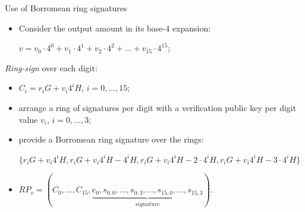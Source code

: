 \documentclass[usenames,dvipsnames]{beamer}
\begin{document}
    \begin{frame}{Use of Borromean ring signatures}
        \begin{itemize}
            \item Consider the output amount in its base-4 expansion: \begin{center}
            $ v = v_0\cdot 4^0 + v_1\cdot 4^1 + v_2\cdot 4^2 + \dots + v_{15}\cdot 4^{15}$;
            \end{center}
        \end{itemize}
        \textit{Ring-sign} over each digit:
        \begin{itemize}
            \item $C_i = r_iG + v_i4^iH$, $i=0,\hdots,15$;
            \item arrange a ring of signatures per digit with a verification public key per digit value $v_i$, $i=0,\dots,3$;
            \item provide a Borromean ring signature over the rings: \begin{center}
            $\{r_iG + v_i4^iH, r_iG + v_i4^iH - 4^iH, r_iG + v_i4^iH - 2\cdot4^iH, r_iG + v_i4^iH - 3\cdot4^iH\}$
            \end{center}
            \item $RP_v = (C_0,\dots,C_{15},\underbrace{e_0,s_{0,0},\dots,s_{0,3},\dots,s_{15,0},\dots,s_{15,3}}_{signature}) $.
        \end{itemize}
    \end{frame}
    
    
\end{document}
